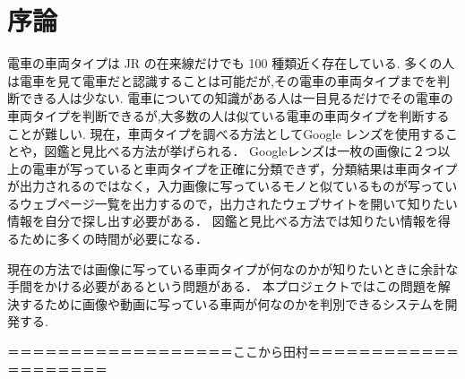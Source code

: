 

\chapter{序論}\label{joron}

電車の車両タイプは JR の在来線だけでも 100 種類近く存在している.
多くの人は電車を見て電車だと認識することは可能だが,その電車の車両タイプまでを判断できる人は少ない.
電車についての知識がある人は一目見るだけでその電車の車両タイプを判断できるが,大多数の人は似ている電車の車両タイプを判断することが難しい.
現在，車両タイプを調べる方法としてGoogle レンズを使用することや，図鑑と見比べる方法が挙げられる．
Googleレンズは一枚の画像に２つ以上の電車が写っていると車両タイプを正確に分類できず，分類結果は車両タイプが出力されるのではなく，入力画像に写っているモノと似ているものが写っているウェブページ一覧を出力するので，出力されたウェブサイトを開いて知りたい情報を自分で探し出す必要がある．
図鑑と見比べる方法では知りたい情報を得るために多くの時間が必要になる．

現在の方法では画像に写っている車両タイプが何なのかが知りたいときに余計な手間をかける必要があるという問題がある．
本プロジェクトではこの問題を解決するために画像や動画に写っている車両が何なのかを判別できるシステムを開発する.

＝＝＝＝＝＝＝＝＝＝＝＝＝＝＝＝＝＝ここから田村＝＝＝＝＝＝＝＝＝＝＝＝＝＝＝＝＝＝＝＝\\


